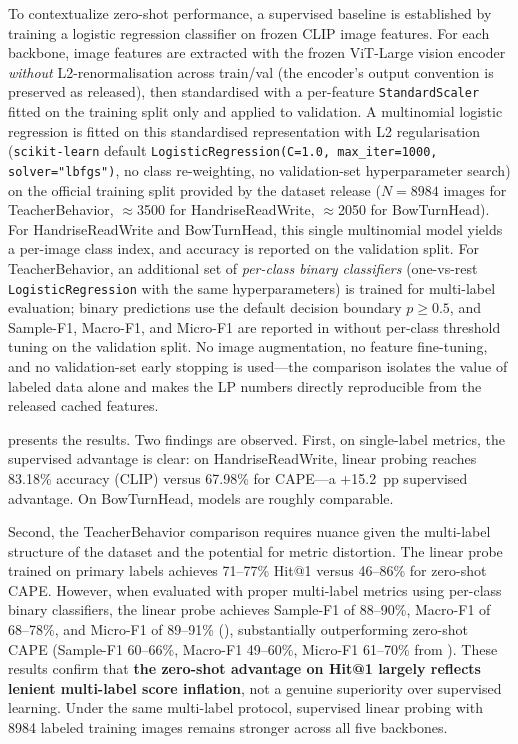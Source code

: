 \documentclass[symmetry,article,submit,pdftex,moreauthors]{Definitions/mdpi}
\begin{document}
To contextualize zero-shot performance, a supervised baseline is established by training a logistic regression classifier on frozen CLIP image features. For each backbone, image features are extracted with the frozen ViT-Large vision encoder \emph{without} L2-renormalisation across train/val (the encoder's output convention is preserved as released), then standardised with a per-feature \texttt{StandardScaler} fitted on the training split only and applied to validation. A multinomial logistic regression is fitted on this standardised representation with L2 regularisation (\texttt{scikit-learn} default \texttt{LogisticRegression(C=1.0, max\_iter=1000, solver="lbfgs")}, no class re-weighting, no validation-set hyperparameter search) on the official training split provided by the dataset release ($N=8984$ images for TeacherBehavior, $\approx$3500 for HandriseReadWrite, $\approx$2050 for BowTurnHead). For HandriseReadWrite and BowTurnHead, this single multinomial model yields a per-image class index, and accuracy is reported on the validation split. For TeacherBehavior, an additional set of \emph{per-class binary classifiers} (one-vs-rest \texttt{LogisticRegression} with the same hyperparameters) is trained for multi-label evaluation; binary predictions use the default decision boundary $p\geq0.5$, and Sample-F1, Macro-F1, and Micro-F1 are reported in  without per-class threshold tuning on the validation split. No image augmentation, no feature fine-tuning, and no validation-set early stopping is used---the comparison isolates the value of labeled data alone and makes the LP numbers directly reproducible from the released cached features.

 presents the results. Two findings are observed. First, on single-label metrics, the supervised advantage is clear: on HandriseReadWrite, linear probing reaches 83.18\% accuracy (CLIP) versus 67.98\% for CAPE---a +15.2~pp supervised advantage. On BowTurnHead, models are roughly comparable.

Second, the TeacherBehavior comparison requires nuance given the multi-label structure of the dataset and the potential for metric distortion. The linear probe trained on primary labels achieves 71--77\% Hit@1 versus 46--86\% for zero-shot CAPE. However, when evaluated with proper multi-label metrics using per-class binary classifiers, the linear probe achieves Sample-F1 of 88--90\%, Macro-F1 of 68--78\%, and Micro-F1 of 89--91\% (), substantially outperforming zero-shot CAPE (Sample-F1 60--66\%, Macro-F1 49--60\%, Micro-F1 61--70\% from ). These results confirm that \textbf{the zero-shot advantage on Hit@1 largely reflects lenient multi-label score inflation}, not a genuine superiority over supervised learning. Under the same multi-label protocol, supervised linear probing with 8984 labeled training images remains stronger across all five backbones.
\end{document}
